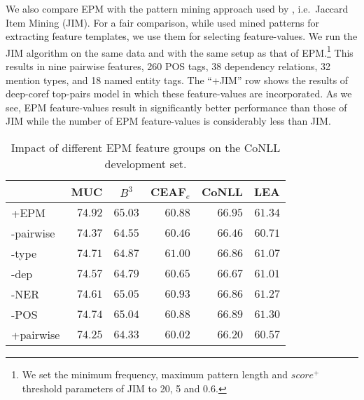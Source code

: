 We also compare EPM with the pattern mining approach used by , i.e.\ Jaccard Item Mining (JIM).
For a fair comparison, while  used mined patterns for extracting feature templates, we use them for selecting feature-values.
We run the JIM algorithm on 
the same data and with the same setup as that of EPM.\footnote{
We set the minimum frequency, maximum pattern length and $score^+$ threshold parameters of JIM to 20, 5 and 0.6.}
This results in nine pairwise features, 
260 POS tags, 38 dependency relations, 32 mention types, and 18 named entity tags.
The ``+JIM'' row shows the results of deep-coref top-pairs model 
in which these feature-values are incorporated.
As we see, EPM feature-values result in significantly better performance than those of JIM
while the number of EPM feature-values is considerably less than JIM.
%
\begin{table}[!htb]
    \begin{center}\footnotesize
    \begin{tabular}{@{}l|r|r|r|r|r@{\hskip3pt}}
     \multicolumn{1}{c}{} & \multicolumn{1}{c}{MUC} & \multicolumn{1}{c}{$B^3$} & \multicolumn{1}{c}{CEAF$_e$} & \multicolumn{1}{c}{CoNLL} & \multicolumn{1}{c}{LEA} \\ \hline
     \hline
     +EPM  & $74.92$ & $65.03$ & $60.88$ & $66.95$ & $61.34$ \\ \hline
     -pairwise & $74.37$ & $64.55$ & $60.46$ & $66.46$ &$60.71$\\
     -type & $74.71$ & $64.87$ & $61.00$ & $66.86$ & $61.07$\\
     -dep & $74.57$ & $64.79$ & $60.65$ & $66.67$ & $61.01$\\
     -NER & $74.61$ & $65.05$ & $60.93$ & $66.86$ & $61.27$\\
     -POS & $74.74$ & $65.04$ & $60.88$ & $66.89$ & $61.30$\\ \hline
     +pairwise & $74.25$ & $64.33$ & $60.02$ & $66.20$ & $60.57$ \\ 
     \hline
    \end{tabular}
    \end{center}
    \caption{Impact of different EPM feature groups on the CoNLL development set.}
    \label{tab:feature-ablation}
\end{table}

